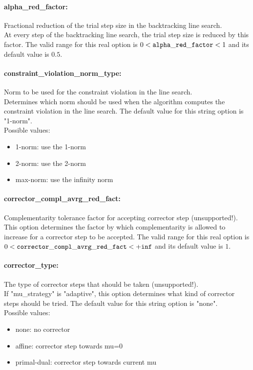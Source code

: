 \paragraph{alpha\_red\_factor:}\label{sec:alpha_red_factor} Fractional reduction of the trial step size in the backtracking line search. $\;$ \\
 At every step of the backtracking line search,
the trial step size is reduced by this factor. The valid range for this real option is 
$0 <  {\tt alpha\_red\_factor } <  1$
and its default value is $0.5$.


\paragraph{constraint\_violation\_norm\_type:}\label{sec:constraint_violation_norm_type} Norm to be used for the constraint violation in the line search. $\;$ \\
 Determines which norm should be used when the
algorithm computes the constraint violation in
the line search.
The default value for this string option is "1-norm".
\\ 
Possible values:
\begin{itemize}
   \item 1-norm: use the 1-norm
   \item 2-norm: use the 2-norm
   \item max-norm: use the infinity norm
\end{itemize}

\paragraph{corrector\_compl\_avrg\_red\_fact:}\label{sec:corrector_compl_avrg_red_fact}  Complementarity tolerance factor for accepting corrector step {\small (unsupported!)}.\\
This option determines the factor by which complementarity is allowed to
increase for a corrector step to be accepted.
The valid range for this real option is 
$0 <  {\tt corrector\_compl\_avrg\_red\_fact } <  {\tt +inf}$
and its default value is $1$.

\paragraph{corrector\_type:}\label{sec:corrector_type} The type of corrector steps that should be taken (unsupported!). $\;$ \\
If "mu\_strategy" is "adaptive", this option determines what kind of corrector steps should be tried.
The default value for this string option is "none".
\\ 
Possible values:
\begin{itemize}
   \item none: no corrector
   \item affine: corrector step towards mu=0
   \item primal-dual: corrector step towards current mu
\end{itemize}


